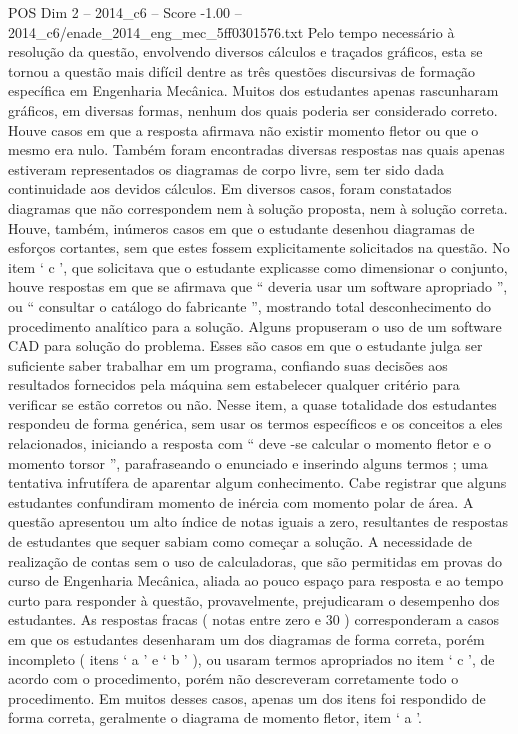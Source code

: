 \begin{textsample}{POS Dim 2 – 2014\_c6 – Score -1.00 – 2014\_c6/enade\_2014\_eng\_mec\_5ff0301576.txt}
Pelo tempo necessário à resolução da questão, envolvendo diversos cálculos e traçados gráficos, esta se tornou a questão mais difícil dentre as três questões discursivas de formação específica em Engenharia Mecânica.
Muitos dos estudantes apenas rascunharam gráficos, em diversas formas, nenhum dos quais poderia ser considerado correto.
Houve casos em que a resposta afirmava não existir momento fletor ou que o mesmo era nulo.
Também foram encontradas diversas respostas nas quais apenas estiveram representados os diagramas de corpo livre, sem ter sido dada continuidade aos devidos cálculos.
Em diversos casos, foram constatados diagramas que não correspondem nem à solução proposta, nem à solução correta.
Houve, também, inúmeros casos em que o estudante desenhou diagramas de esforços cortantes, sem que estes fossem explicitamente solicitados na questão.
No item ‘ c ’, que solicitava que o estudante explicasse como dimensionar o conjunto, houve respostas em que se afirmava que “ deveria usar um software apropriado ”, ou “ consultar o catálogo do fabricante ”, mostrando total desconhecimento do procedimento analítico para a solução.
Alguns propuseram o uso de um software CAD para solução do problema.
Esses são casos em que o estudante julga ser suficiente saber trabalhar em um programa, confiando suas decisões aos resultados fornecidos pela máquina sem estabelecer qualquer critério para verificar se estão corretos ou não.
Nesse item, a quase totalidade dos estudantes respondeu de forma genérica, sem usar os termos específicos e os conceitos a eles relacionados, iniciando a resposta com “ deve -se calcular o momento fletor e o momento torsor ”, parafraseando o enunciado e inserindo alguns termos ; uma tentativa infrutífera de aparentar algum conhecimento.
Cabe registrar que alguns estudantes confundiram momento de inércia com momento polar de área.
A questão apresentou um alto índice de notas iguais a zero, resultantes de respostas de estudantes que sequer sabiam como começar a solução.
A necessidade de realização de contas sem o uso de calculadoras, que são permitidas em provas do curso de Engenharia Mecânica, aliada ao pouco espaço para resposta e ao tempo curto para responder à questão, provavelmente, prejudicaram o desempenho dos estudantes.
As respostas fracas ( notas entre zero e 30 ) corresponderam a casos em que os estudantes desenharam um dos diagramas de forma correta, porém incompleto ( itens ‘ a ’ e ‘ b ’ ), ou usaram termos apropriados no item ‘ c ’, de acordo com o procedimento, porém não descreveram corretamente todo o procedimento.
Em muitos desses casos, apenas um dos itens foi respondido de forma correta, geralmente o diagrama de momento fletor, item ‘ a ’.

\end{textsample}
